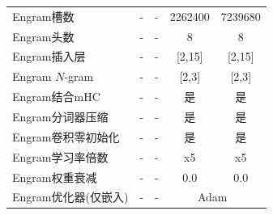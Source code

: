 \begin{longtable}{p{}cccc}
Engram槽数 & - & - & 2262400 & 7239680 \\
Engram头数 & - & - & 8 & 8 \\
Engram插入层 & - & - & [2,15] & [2,15] \\
Engram $N$-gram & - & - & [2,3] & [2,3] \\
Engram结合mHC & - & - & 是 & 是 \\
Engram分词器压缩  & - & - & 是 & 是 \\
Engram卷积零初始化  & - & - & 是 & 是 \\
Engram学习率倍数  & - & - & x5 & x5 \\
Engram权重衰减  & - & - & 0.0 & 0.0 \\
Engram优化器(仅嵌入)  & - & - & \multicolumn{2}{c}{Adam~\cite{engram-kingma2014adam}}  \\
\bottomrule
\end{longtable}
\endgroup
